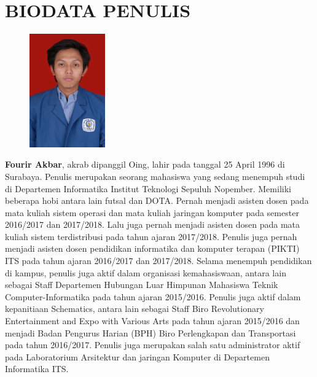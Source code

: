 \documentclass[12pt,oneside,reqno]{ta-its}
\begin{document}
	\chapter{BIODATA PENULIS}
		\begin{figure}
			\includegraphics[width=0.29\textwidth]{images/cover/pic}
		\end{figure}
		\textbf{Fourir Akbar}, akrab dipanggil Oing, lahir pada tanggal 25 April 1996 di Surabaya. Penulis merupakan seorang mahasiswa yang sedang menempuh studi di Departemen Informatika Institut Teknologi Sepuluh Nopember. Memiliki beberapa hobi antara lain futsal dan DOTA. Pernah menjadi asisten dosen pada mata kuliah sistem operasi dan mata kuliah jaringan komputer pada semester 2016/2017 dan 2017/2018. Lalu juga pernah menjadi asisten dosen pada mata kuliah sistem terdistribusi pada tahun ajaran 2017/2018. Penulis juga pernah menjadi asisten dosen pendidikan informatika dan komputer terapan (PIKTI) ITS pada tahun ajaran 2016/2017 dan 2017/2018. Selama menempuh pendidikan di kampus, penulis juga aktif dalam organisasi kemahasiswaan, antara lain sebagai Staff Departemen Hubungan Luar Himpunan Mahasiswa Teknik Computer-Informatika pada tahun ajaran 2015/2016. Penulis juga aktif dalam kepanitiaan Schematics, antara lain sebagai Staff Biro Revolutionary Entertainment and Expo with Various Arts pada tahun ajaran 2015/2016 dan menjadi Badan Pengurus Harian (BPH) Biro Perlengkapan dan Transportasi pada tahun 2016/2017. Penulis juga merupakan salah satu administrator aktif pada Laboratorium Arsitektur dan jaringan Komputer di Departemen Informatika ITS.
\end{document}
